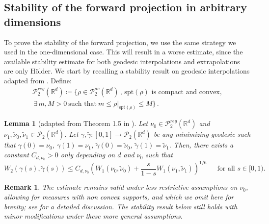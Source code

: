 \documentclass[12pt]{amsart}
\def\mc#1{\mathcal{#1}}
\newtheorem{lemma}{Lemma}
\newtheorem{remark}{Remark}
\begin{document}
\subsection{Stability of the forward projection in arbitrary dimensions}\label{sec:forstabd} To prove the stability of the forward projection, we use the same strategy we used in the one-dimensional case. This will result in a worse estimate, since the available stability estimate for both geodesic interpolations and extrapolations are only H\"older. We start by recalling a stability result on geodesic interpolations adapted from \cite{carlier2024quantitative}. Define:
\begin{multline*}
\mc{P}^{reg}_2(\mathbb{R}^d) \coloneqq \{ \rho \in \mc{P}^{ac}_2(\mathbb{R}^d)\,, \, \mathrm{spt}(\rho) \text{ is compact and convex}, \\ \, \exists \,m, M>0~ \text{such that} ~m\leq \rho |_{\mathrm{spt}(\rho)}\leq M\}\,.
\end{multline*}

\begin{lemma}[adapted from Theorem 1.5 in \cite{carlier2024quantitative}]\label{lem:stabbary} Let $\nu_0 \in \mc{P}_2^{reg}(\mathbb{R}^d)$ and $\nu_1,\tilde{\nu}_0,\tilde{\nu}_1 \in \mc{P}_2(\mathbb{R}^d)$. Let $\gamma,\tilde{\gamma}:[0,1] \rightarrow \mc{P}_2(\mathbb{R}^d)$ be any minimizing geodesic such that $\gamma(0) =\nu_0$, $\gamma(1)=\nu_1$,  $\tilde{\gamma}(0) =\tilde{\nu}_0$, $\tilde{\gamma}(1)=\tilde{\nu}_1$. Then, there exists a constant $C_{d,\nu_0}>0$ only depending on $d$ and $\nu_0$ such that
\[
W_2(\gamma(s),\tilde{\gamma}(s)) \leq C_{d,\nu_0} \left( W_1(\nu_0,\tilde{\nu}_0)+ \frac{s}{1-s} W_1(\nu_1,\tilde{\nu}_1)\right)^{1/6} \, { \quad \text{ for all $s\in [0,1)$}}.
\]
\end{lemma}
\begin{remark}
The estimate remains valid under less restrictive assumptions on $\nu_0$, allowing for measures with non convex supports, and which we omit here for brevity; see \cite{carlier2024quantitative} for a detailed discussion. The stability result below still holds with minor modifications under these more general assumptions.
\end{remark}
\end{document}
